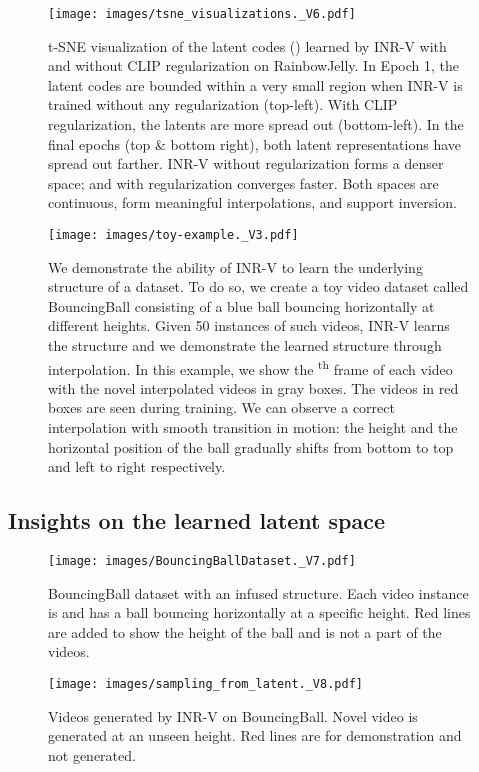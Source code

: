 \documentclass[10pt]{article} \usepackage[accepted]{tmlr}
\begin{document}
\begin{figure}[]
  \centering
  \texttt{[image: images/tsne\_visualizations.\_V6.pdf]}
  \caption{t-SNE visualization of the latent codes () learned by INR-V with and without CLIP regularization on RainbowJelly. In Epoch 1, the latent codes are bounded within a very small region when INR-V is trained without any regularization (top-left). With CLIP regularization, the latents are more spread out (bottom-left). In the final epochs (top \& bottom right), both latent representations have spread out farther. INR-V without regularization forms a denser space; and with regularization converges faster. Both spaces are continuous, form meaningful interpolations, and support inversion.}
  \label{fig:tsnevisualization}
\end{figure}

\begin{figure}[]
  \centering
  \texttt{[image: images/toy-example.\_V3.pdf]}
  \caption{\small We demonstrate the ability of INR-V to learn the underlying structure of a dataset. To do so, we create a toy video dataset called BouncingBall consisting of a blue ball bouncing horizontally at different heights.
  Given 50 instances of such videos, INR-V learns the structure and we demonstrate the learned structure through interpolation. In this example, we show the \textsuperscript{th} frame of each video with the novel interpolated videos in gray boxes. The videos in red boxes are seen during training. We can observe a correct interpolation with smooth transition in motion: the height and the horizontal position of the ball gradually shifts from bottom to top and left to right respectively.}
  \label{fig:toyexampleinterpolation}
\end{figure}


\subsection{Insights on the learned latent space}
\label{sec:insights-appendix}



\begin{wrapfigure}[29]{R}{0.32\textwidth}
    \centering
    \vspace{-10pt}
    \texttt{[image: images/BouncingBallDataset.\_V7.pdf]}
    \caption{BouncingBall dataset with an infused structure. Each video instance is  and has a ball bouncing horizontally at a specific height. Red lines are added to show the height of the ball and is not a part of the videos.}
    \label{fig:bouncingballsdatset}
    \vspace{1.2em}    \texttt{[image: images/sampling\_from\_latent.\_V8.pdf]}
    \caption{Videos generated by INR-V on BouncingBall. Novel video is generated at an unseen height. Red lines are for demonstration and not generated.}
    \label{fig:bouncingballs_sample}
  
\end{wrapfigure}
\end{document}
